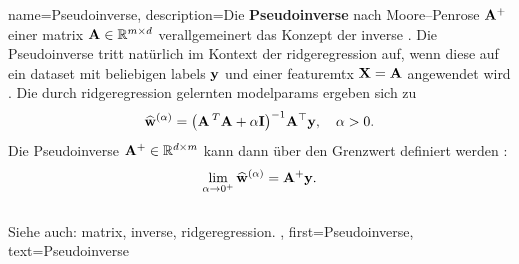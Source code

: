 \makeglossaries


{name={Pseudoinverse},
  description={Die \textbf{Pseudoinverse} nach Moore–Penrose ${\bf A}^{+}$ 
  	einer \gls{matrix} ${\bf A} \in \mathbb{R}^{m \times d}$ verallgemeinert das Konzept der 
  	\gls{inverse} \cite{GolubVanLoanBook}. Die Pseudoinverse\cite{unikassel} tritt natürlich im Kontext der 
  	\gls{ridgeregression} auf, wenn diese auf ein \gls{dataset} mit beliebigen \glspl{label} ${\bf y}$ 
  	und einer \gls{featuremtx} ${\bf X} = {\bf A}$ angewendet wird \cite[Kap.\ 3]{hastie01statisticallearning}. 
  	Die durch \gls{ridgeregression} gelernten \glspl{modelparam} ergeben sich zu
  	\[
  	\widehat{{\bf w}}^{(\alpha)}  = \big({\bf A}\,^{T} {\bf A} + \alpha \mathbf{I} \big)^{-1} {\bf A}^\top {\bf y}, \quad \alpha > 0.
  	\]
  	Die Pseudoinverse ${\bf A}^+ \in \mathbb{R}^{d \times m}$ kann dann über den Grenzwert definiert werden \cite[Kap. 3]{benisrael2003generalized}:
  	\[
  	\lim_{\alpha \to 0^+} \widehat{{\bf w}}^{(\alpha)} = {\bf A}^+ {\bf y}.
  	\]
  	\\
  	Siehe auch: \gls{matrix}, \gls{inverse}, \gls{ridgeregression}.
  },
 first={Pseudoinverse},
 text={Pseudoinverse}
}


